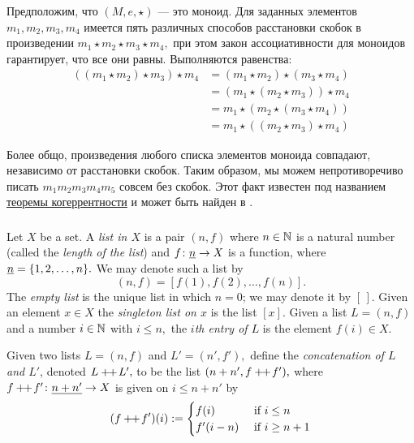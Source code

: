 \documentclass[CT4S-EN-RU]{subfiles}
\begin{document}
\begin{exampleRUS}
Предположим, что $(M,e,\star)$ — это моноид. Для заданных элементов $m_1,m_2,m_3,m_4$ имеется пять различных способов расстановки скобок в произведении $m_1\star m_2\star m_3\star m_4,$ при этом закон ассоциативности для моноидов гарантирует, что все они равны. Выполняются равенства:
\begin{align*}
((m_1\star m_2)\star m_3)\star m_4&=(m_1\star m_2)\star (m_3\star m_4)\\
&=(m_1\star(m_2\star m_3))\star m_4\\
&=m_1\star(m_2\star (m_3\star m_4))\\
&=m_1\star((m_2\star m_3)\star m_4)
\end{align*}

Более общо, произведения любого списка элементов моноида совпадают, независимо от расстановки скобок. Таким образом, мы можем непротиворечиво писать $m_1m_2m_3m_4m_5$ совсем без скобок. Этот факт известен под названием \href{http://en.wikipedia.org/wiki/Coherence_theorem}{\text теоремы когеррентности} и может быть найден в \cite{Mac}.
\end{exampleRUS}


\subsubsection{}\label{sec:free monoid}

\begin{definitionENG}\label{def:list}
Let $X$ be a set. A {\em list in $X$} is a pair $(n,f)$ where $n\in{\mathbb N}$ is a natural number (called the {\em length of the list}) and $f\colon\underline{n}\rightarrow X$ is a function, where $\underline{n}=\{1,2,\ldots,n\}.$ We may denote such a list by
$$(n,f)=[f(1),f(2),\ldots,f(n)].$$
The {\em empty list} is the unique list in which $n=0$; we may denote it by $[\,].$ Given an element $x\in X$ the {\em singleton list on $x$} is the list $[x].$ Given a list $L=(n,f)$ and a number $i\in{\mathbb N}$ with $i\leq n,$ the {\em $i$th entry of $L$} is the element $f(i)\in X.$ 

Given two lists $L=(n,f)$ and $L'=(n',f'),$ define the {\em concatenation of $L$ and $L'$}, denoted $L+\!\!+\hspace{1pt} L',$ to be the list $(n+n',f+\!\!+\hspace{1pt} f'),$ where $f+\!\!+\hspace{1pt} f'\colon \underline{n+n'}\rightarrow X$ is given on $i\leq n+n'$ by
$$(f+\!\!+\hspace{1pt} f')(i):=
\begin{cases}
f(i)&\textnormal{ if }i\leq n\\
f'(i-n)&\textnormal{ if }i\geq n+1
\end{cases}
$$
\end{definitionENG}
\end{document}
